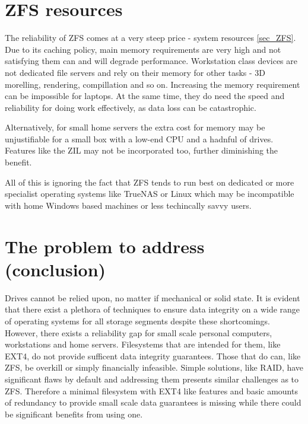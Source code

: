     \section{ZFS resources}

        The reliability of ZFS comes at a very steep price - system resources
        \ref{sec_ZFS}. Due to its caching policy, main memory requirements are
        very high and not satisfying them can and will degrade performance.
        Workstation class devices are not dedicated file servers and rely on
        their memory for other tasks - 3D morelling, rendering, compillation
        and so on. Increasing the memory requirement can be impossible for
        laptops. At the same time, they do need the speed and reliability for
        doing work effectively, as data loss can be catastrophic.

        Alternatively, for small home servers the extra cost for memory may be
        unjustifiable for a small box with a low-end CPU and a hadnful of
        drives. Features like the ZIL may not be incorporated too, further
        diminishing the benefit.

        All of this is ignoring the fact that ZFS tends to run best on
        dedicated or more specialist operating systems like TrueNAS or Linux
        which may be incompatible with home Windows based machines or less
        techincally savvy users.

    \section{The problem to address (conclusion)}

        Drives cannot be relied upon, no matter if mechanical or solid state.
        It is evident that there exist a plethora of techniques to ensure data
        integrity on a wide range of operating systems for all storage segments
        despite these shortcomings. However, there exists a reliability gap for
        small scale personal computers, workstations and home servers.
        Filesystems that are intended for them, like EXT4, do not provide
        sufficent data integrity guarantees. Those that do can, like ZFS, be
        overkill or simply financially infeasible. Simple solutions, like RAID,
        have significant flaws by default and addressing them presents similar
        challenges as to ZFS. Therefore a minimal filesystem with EXT4 like
        features and basic amounts of redundancy to provide small scale data
        guarantees is missing while there could be significant benefits from
        using one.
